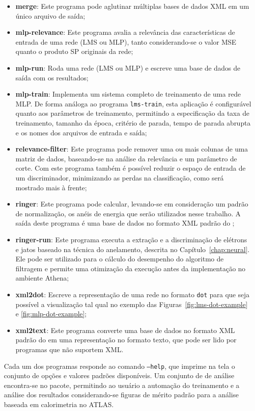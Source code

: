 \begin{itemize}
\item \textbf{merge}: Este programa pode aglutinar múltiplas bases de dados
XML em um único arquivo de saída; 

\item \textbf{mlp-relevance}: Este programa avalia a relevância das
características de entrada de uma rede (LMS ou MLP), tanto considerando-se o
valor MSE quanto o produto SP originais da rede;

\item \textbf{mlp-run}: Roda uma rede (LMS ou MLP) e escreve uma base de dados
de saída com os resultados;

\item \textbf{mlp-train}: Implementa um sistema completo de treinamento de 
uma rede MLP. De forma análoga ao programa \texttt{lms-train}, esta aplicação
é configurável quanto aos parâmetros de treinamento, permitindo a
especificação da taxa de treinamento, tamanho da época, critério de parada,
tempo de parada abrupta e os nomes dos arquivos de entrada e saída;

\item \textbf{relevance-filter}: Este programa pode remover uma ou mais
colunas de uma matriz de dados, baseando-se na análise da relevância e um
parâmetro de corte. Com este programa também é possível reduzir o espaço de
entrada de um discriminador, minimizando as perdas na classificação, como será
mostrado mais à frente;

\item \textbf{ringer}: Este programa pode calcular, levando-se em consideração
um padrão de normalização, os anéis de energia que serão utilizados nesse
trabalho. A saída deste programa é uma base de dados no formato XML padrão do
;

\item \textbf{ringer-run}: Este programa executa a extração e a discriminação
de elétrons e jatos baseado na técnica do anelamento, descrita no
Capítulo~\ref{chap:neural}. Ele pode ser utilizado para o cálculo do
desempenho do algoritmo de filtragem  e permite uma otimização da
execução antes da implementação no ambiente Athena;

\item \textbf{xml2dot}: Escreve a representação de uma rede no formato
\texttt{dot} para que seja possível a visualização tal qual no exemplo das
Figuras~\ref{fig:lms-dot-example} e \ref{fig:mlp-dot-example};

\item \textbf{xml2text}: Este programa converte uma base de dados no formato
XML padrão do  em uma representação no formato texto, que
pode ser lido por programas que não suportem XML.
\end{itemize}

Cada um dos programas responde ao comando \texttt{--help}, que imprime na tela
o conjunto de opções e valores padrões disponíveis. Um conjunto de
 de análise encontra-se no pacote, permitindo ao usuário
a automação do treinamento e a análise dos resultados considerando-se figuras
de mérito padrão para a análise baseada em calorimetria no ATLAS.

